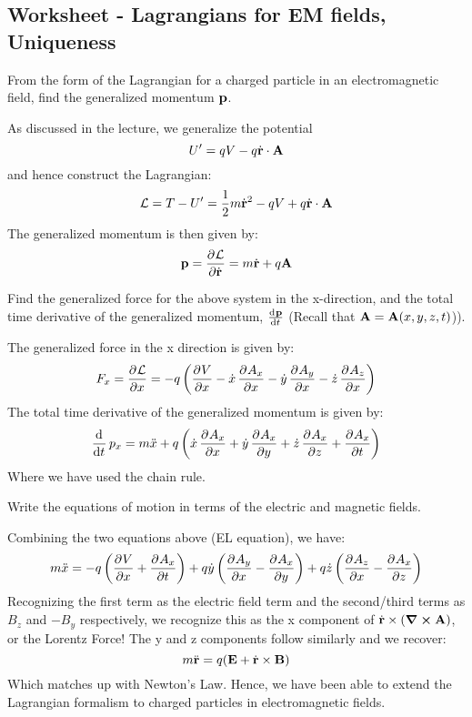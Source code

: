 \documentclass[../PHYS306Notes.tex]{subfiles}
\begin{document}
\subsection{Worksheet - Lagrangians for EM fields, Uniqueness}
\begin{p}
From the form of the Lagrangian for a charged particle in an electromagnetic field, find the generalized momentum $\mathbf{p}$.
\end{p}
\begin{s}
As discussed in the lecture, we generalize the potential \[U' = qV - q\dot{\mathbf{r}}\cdot\mathbf{A}\]
and hence construct the Lagrangian:
\[\mathcal{L} = T - U' = \frac{1}{2}m\dot{\mathbf{r}}^2 - qV + q\dot{\mathbf{r}}\cdot\mathbf{A}\]
The generalized momentum is then given by:
\[\v{p} = \dpd{\LL}{\dot{\v{r}}} = m\dot{\v{r}} + q\v{A}\]
\end{s}

\begin{p}
Find the generalized force for the above system in the x-direction, and the total time derivative of the generalized momentum, $\od{\v{p}}{t}$ (Recall that $\mathbf{A} = \mathbf{A}(x,y,z,t)$)).
\end{p}
\begin{s}
The generalized force in the x direction is given by:
\[F_x = \dpd{\LL}{x} = -q\left(\dpd{V}{x} - \dot{x}\dpd{A_x}{x} - \dot{y}\dpd{A_y}{x} - \dot{z}\dpd{A_z}{x}\right)\]
The total time derivative of the generalized momentum is given by:
\[\dod{}{t}p_x = m\ddot{x} + q\left(\dot{x}\dpd{A_x}{x} + \dot{y}\dpd{A_x}{y} + \dot{z}\dpd{A_x}{z} + \dpd{A_x}{t}\right)\]
Where we have used the chain rule. 
\end{s}

\begin{p}
Write the equations of motion in terms of the electric and magnetic fields.
\end{p}
\begin{s}
Combining the two equations above (EL equation), we have:
\[m\ddot{x} = -q\left(\dpd{V}{x} + \dpd{A_x}{t}\right) + q\dot{y}\left(\dpd{A_y}{x} - \dpd{A_x}{y}\right) + q\dot{z}\left(\dpd{A_z}{x} - \dpd{A_x}{z}\right)\]
Recognizing the first term as the electric field term and the second/third terms as $B_z$ and $-B_y$ respectively, we recognize this as the x component of $\dot{\mathbf{r}}\times \left(\curl{\ensuremath{\mathbf{A}}}\right)$, or the Lorentz Force! The y and z components follow similarly and we recover:
\[m\ddot{\mathbf{r}} = q(\mathbf{E} + \dot{\mathbf{r}}\times\mathbf{B})\]
Which matches up with Newton's Law. Hence, we have been able to extend the Lagrangian formalism to charged particles in electromagnetic fields.
\end{s}
\end{document}
